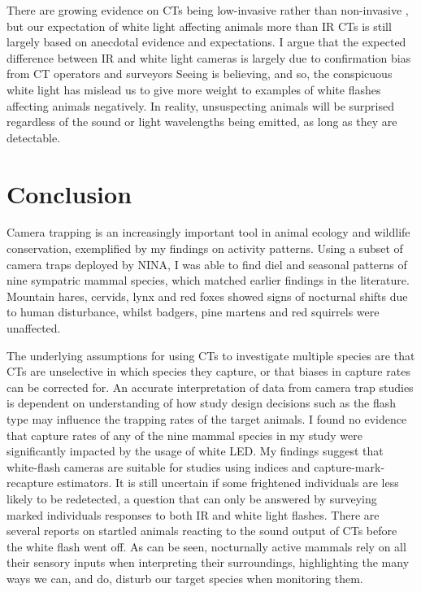 There are growing evidence on CTs being low-invasive rather than non-invasive \autocite{Meek2014a,Meek2016,Beddari2019,Henrich2020}, but our expectation of white light affecting animals more than IR CTs is still largely based on anecdotal evidence and expectations.
I argue that the expected difference between IR and white light cameras is largely due to confirmation bias from CT operators and surveyors
Seeing is believing, and so, the conspicuous white light has mislead us to give more weight to examples of white flashes affecting animals negatively.
In reality, unsuspecting animals will be surprised regardless of the sound or light wavelengths being emitted, as long as they are detectable. 



\chapter{Conclusion}
Camera trapping is an increasingly important tool in animal ecology and wildlife conservation, exemplified by my findings on activity patterns. Using a subset of camera traps deployed by NINA, I was able to find diel and seasonal patterns of nine sympatric mammal species, which matched earlier findings in the literature. Mountain hares, cervids, lynx and red foxes showed signs of nocturnal shifts due to human disturbance, whilst badgers, pine martens and red squirrels were unaffected.

The underlying assumptions for using CTs to investigate multiple species are that CTs are unselective in which species they capture, or that biases in capture rates can be corrected for.
An accurate interpretation of data from camera trap studies is dependent on understanding of how study design decisions such as the flash type may influence the trapping rates of the target animals. 
I found no evidence that capture rates of any of the nine mammal species in my study were significantly impacted by the usage of white LED. My findings suggest that white-flash cameras are suitable for studies using indices and capture-mark-recapture estimators. 
It is still uncertain if some frightened individuals are less likely to be redetected, a question that can only be answered by surveying marked individuals responses to both IR and white light flashes.
There are several reports on startled animals reacting to the sound output of CTs before the white flash went off. 
As can be seen, nocturnally active mammals rely on all their sensory inputs when interpreting their surroundings, highlighting the many ways we can, and do, disturb our target species when monitoring them.


